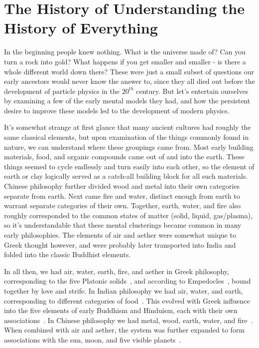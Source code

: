 \chapter{The History of Understanding the History of Everything}

In the beginning people knew nothing. What is the universe made of? Can you turn a rock into gold? What happens if you get smaller and smaller - is there a whole different world down there? These were just a small subset of questions our early ancestors would never know the answer to, since they all died out before the development of particle physics in the $20^{th}$ century. But let's entertain ourselves by examining a few of the early mental models they had, and how the persistent desire to improve these models led to the development of modern physics.

It's somewhat strange at first glance that many ancient cultures had roughly the same classical elements, but upon examination of the things commonly found in nature, we can understand where these groupings came from. Most early building materials, food, and organic compounds came out of and into the earth. These things seemed to cycle endlessly and turn easily into each other, so the element of earth or clay logically served as a catch-all building block for all such materials. Chinese philosophy further divided wood and metal into their own categories separate from earth. Next came fire and water, distinct enough from earth to warrant separate categories of their own. Together, earth, water, and fire also roughly corresponded to the common states of matter (solid, liquid, gas/plasma), so it's understandable that these mental clusterings became common in many early philosophies. The elements of air and aether were somewhat unique to Greek thought however, and were probably later transported into India and folded into the classic Buddhist elements.

In all then, we had air, water, earth, fire, and aether in Greek philosophy, corresponding to the five Platonic solids~\cite{Plato}, and according to Empedocles~\cite{Empedocles}, bound together by love and strife. In Indian philosophy we had air, water, and earth, corresponding to different categories of food~\cite{Chandogya}. This evolved with Greek influence into the five elements of early Buddhism and Hinduism, each with their own associations~\cite{friesian}. In Chinese philosophy we had metal, wood, earth, water, and fire~\cite{Tao}. When combined with air and aether, the system was further expanded to form associations with the sun, moon, and five visible planets~\cite{friesian}.

